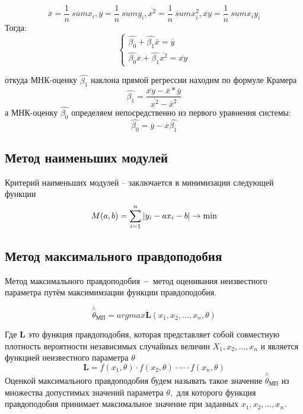 \documentclass[a4]{article}
\begin{document}
						$$\overline{x} = \frac{1}{n} \ sum x_i, \overline{y} = \frac{1}{n} \ sum y_i, \overline{x^2} = \frac{1}{n} \ sum x^2_i, \overline{xy} = \frac{1}{n} \ sum x_iy_i$$
						Тогда:
						\begin{equation*} 
						\begin{cases}
						\hat{\beta_0} + \hat{\beta_1}\overline{x} = \overline{y}\\
						\hat{\beta_0}\overline{x} + \hat{\beta_1} \overline{x^2} = \overline{xy}
						\end{cases}
						\end{equation*}
						
						откуда МНК-оценку $\hat{\beta_1}$ наклона прямой регрессии находим по формуле
						Крамера
						$$\hat{\beta_1} = \frac{\overline{xy} - \overline{x} * \overline{y}}{\overline{x^2} - {\overline{x}}^2}$$
						а МНК-оценку $\hat{\beta_0}$ определяем непосредственно из первого уравнения системы:
						$$\hat{\beta_0} = \overline{y} - \overline{x}\hat{\beta_1}$$
						
						\subsection{Метод наименьших модулей}
						Критерий наименьших модулей – заключается в минимизации следующей функции
						$$
						M(a,b) = \sum\limits_{i=1}^n\vert y_i-ax_i-b\vert\to\min\hfill
						$$			
						
						\subsection{Метод максимального правдоподобия}
						Метод максимального правдоподобия $\--$ метод оценивания неизвестного параметра путём максимимзации функции правдоподобия.
						
						$$\overset{\wedge}{\theta}_{\text{МП}}=argmax \mathbf{L}(x_1,x_2,\ldots,x_n,\theta)
						$$
						
						Где $\mathbf{L}$ это функция правдоподобия, которая представляет собой совместную плотность вероятности независимых случайных величин $X_1,x_2,\ldots,x_n$ и является функцией неизвестного параметра $\theta$
						$$\mathbf{L} = f(x_1,\theta)\cdot f(x_2,\theta)\cdot\cdots\cdot f(x_n,\theta)
						$$
						Оценкой максимального правдоподобия будем называть такое значение $\overset{\wedge}{\theta}_{\text{МП}}$ из множества допустимых значений параметра $\theta,$ для которого функция правдоподобия принимает максимальное значение при заданных $x_1,x_2,\ldots,x_n.$
						
\end{document}
